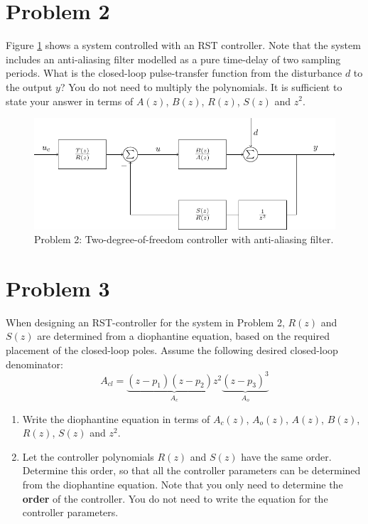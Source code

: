 \documentclass{scrartcl}
\begin{document}
\section*{Problem 2}
\label{sec:orgheadline2}
Figure \ref{fig:rst} shows a system controlled with an RST controller. Note that the system includes an anti-aliasing filter modelled as a pure time-delay of two sampling periods. What is the closed-loop pulse-transfer function from the disturbance \(d\) to the output \(y\)? You do not need to multiply the polynomials. It is sufficient to state your answer in terms of \(A(z)\), \(B(z)\), \(R(z)\), \(S(z)\) and \(z^2\).
\begin{figure}[h]
\begin{center}
\includegraphics[]{rst-anti-aliasing}
\caption{Problem 2: Two-degree-of-freedom controller with anti-aliasing filter.}
\label{fig:rst}
\end{center}
\end{figure}


\section*{Problem 3}
\label{sec:orgheadline3}
When designing an RST-controller for the system in Problem 2, \(R(z)\) and \(S(z)\) are determined from a diophantine equation, based on the required placement of the closed-loop poles. Assume the following desired closed-loop denominator:
\begin{equation}
A_{cl} = \underbrace{(z-p_1)(z-p_2)z^2}_{A_c}\underbrace{(z-p_3)^3}_{A_o}
\end{equation}
\begin{enumerate}
\item Write the diophantine equation in terms of \(A_c(z)\), \(A_o(z)\), \(A(z)\), \(B(z)\), \(R(z)\), \(S(z)\) and \(z^2\).
\item Let the controller polynomials \(R(z)\) and \(S(z)\) have the same order. Determine this order, so that all the controller parameters can be determined from the diophantine equation. Note that you only need to determine the \textbf{order} of the controller. You do not need to write the equation for the controller parameters.
\end{enumerate}
\end{document}
